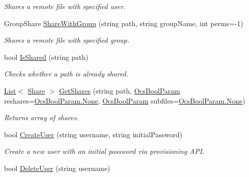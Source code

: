 \begin{DoxyCompactItemize}
\begin{DoxyCompactList}\small\item\em Shares a remote file with specified user. \end{DoxyCompactList}\item 
Group\+Share \hyperlink{classowncloudsharp_1_1_client_a22625407b475bd43c292fc80fbcebad9}{Share\+With\+Group} (string path, string group\+Name, int perms=-\/1)
\begin{DoxyCompactList}\small\item\em Shares a remote file with specified group. \end{DoxyCompactList}\item 
bool \hyperlink{classowncloudsharp_1_1_client_a241b88019805ddd87e8d596a6cf6c7a9}{Is\+Shared} (string path)
\begin{DoxyCompactList}\small\item\em Checks whether a path is already shared. \end{DoxyCompactList}\item 
\hyperlink{classowncloudsharp_1_1_client_a914c144ebbe207958829523f7eda3609}{List}$<$ \hyperlink{namespaceowncloudsharp_a86ba7b86b85c7f5be2304a1ef7ae3157a5a95a425f74314a96f13a2f136992178}{Share} $>$ \hyperlink{classowncloudsharp_1_1_client_acd8b3359561282563c774b6e4784cb3d}{Get\+Shares} (string path, \hyperlink{namespaceowncloudsharp_a7d494b18f174086318df1bdf916068b5}{Ocs\+Bool\+Param} reshares=\hyperlink{namespaceowncloudsharp_a86ba7b86b85c7f5be2304a1ef7ae3157a6adf97f83acf6453d4a6a4b1070f3754}{Ocs\+Bool\+Param.\+None}, \hyperlink{namespaceowncloudsharp_a7d494b18f174086318df1bdf916068b5}{Ocs\+Bool\+Param} subfiles=\hyperlink{namespaceowncloudsharp_a86ba7b86b85c7f5be2304a1ef7ae3157a6adf97f83acf6453d4a6a4b1070f3754}{Ocs\+Bool\+Param.\+None})
\begin{DoxyCompactList}\small\item\em Returns array of shares. \end{DoxyCompactList}\item 
bool \hyperlink{classowncloudsharp_1_1_client_a7e285455e3f0cf437d9359956b6feaa5}{Create\+User} (string username, string initial\+Password)
\begin{DoxyCompactList}\small\item\em Create a new user with an initial password via provisioning A\+P\+I. \end{DoxyCompactList}\item 
bool \hyperlink{classowncloudsharp_1_1_client_a0603de03c323c55dc53cea24516ecf31}{Delete\+User} (string username)

\end{DoxyCompactItemize}
